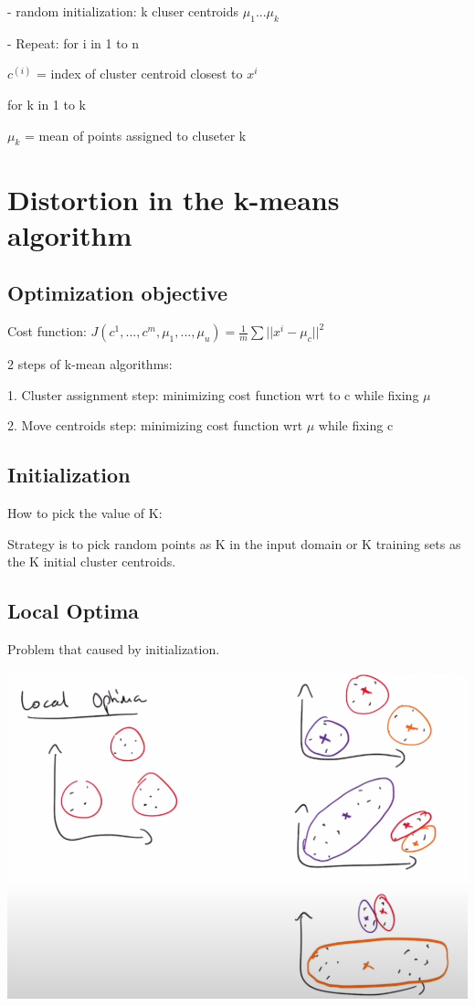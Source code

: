 \documentclass{article}
\begin{document}
- random initialization: k cluser centroids $\mu_1...\mu_k$

- Repeat: 
    for i in 1 to n

    \hspace{1.1cm}$c^{(i)}$ = index of cluster centroid closest to $x^i$

    for k in 1 to k

    \hspace{1.1cm}$\mu_k$ = mean of points assigned to cluseter k


\section*{Distortion in the k-means algorithm}

\subsection*{Optimization objective }
Cost function: $J(c^1, ... , c^m, \mu_1, ..., \mu_u) = \frac{1}{m}\sum ||x^i -\mu_c||^2$

2 steps of k-mean algorithms:

1. Cluster assignment step: minimizing cost function wrt to c while fixing $\mu$

2. Move centroids step: minimizing cost function wrt $\mu$ while fixing c

\subsection*{Initialization}
How to pick the value of K:

                            
Strategy is to pick random points as K in the input domain or K training sets as the K initial cluster centroids. 

\subsection*{Local Optima}
Problem that caused by initialization. 

\includegraphics[width=0.5\linewidth]{W2V3.png}
\end{document}
